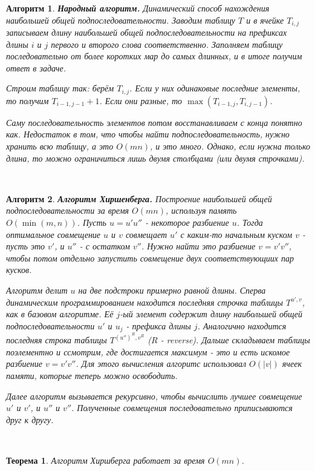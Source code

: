 \documentclass[a4paper]{article}
\theoremstyle{indented}
\newtheorem{theorem}{Теорема}
\newtheorem{alg}{Алгоритм}
\theoremstyle{definition}
\theoremstyle{remark}
\begin{document}
\begin{alg}
    \textbf{Народный алгоритм.} Динамический способ нахождения наибольшей общей подпоследовательности. Заводим таблицу $T$ и в ячейке $T_{i, j}$ записываем длину наибольшей общей подпоследовательности на префиксах длины $i$ и $j$ первого и второго слова соответственно. Заполняем таблицу последовательно от более коротких мар до самых длинных, и в итоге получим ответ в задаче. \ 

    Строим таблицу так: берём $T_{i, j}$. Если у них одинаковые последние элементы, то получим $T_{i-1, j-1}+1$. Если они разные, то $\max({T_{i-1, j}, T_{i, j-1}})$. \ 

    Саму последовательность элементов потом восстанавливаем с конца понятно как. Недостаток в том, что чтобы найти подпоследовательность, нужно хранить всю таблицу, а это $O(mn)$, и это много. Однако, если нужна только длина, то можно ограничиться лишь двумя столбцами (или двумя строчками).
\end{alg} \

\begin{alg}
    \textbf{Алгоритм Хиршенберга.} Построение наибольшей общей подпоследовательности за время $O(mn)$, используя память $O(\min(m, n))$. Пусть $u=u'u''$ - некоторое разбиение $u$. Тогда оптимальное совмещение $u$ и $v$ совмещает $u'$ с каким-то начальным куском $v$ - пусть это $v'$, и $u''$ - с остатком $v''$. Нужно найти это разбиение $v=v'v''$, чтобы потом отдельно запустить совмещение двух соответствующиих пар кусков. \ 

    Алгоритм делит $u$ на две подстроки примерно равной длины. Сперва динамическим программированием находится последняя строчка таблицы $T^{u', v}$, как в базовом алгоритме. Её $j$-ый элемент содержит длину наибольшей общей подпоследовательности $u'$ и $u_j$ - префикса длины $j$. Аналогично находится последняя строка таблицы $T^{(u'')^R, v^R}$ ($R$ - reverse). Дальше складываем таблицы поэлементно и ссмотрим, где достигается максимум - это и есть искомое разбиение $v=v'v''$. Для этого вычисления алгоритс использовал $O(|v|)$ ячеек памяти, которые теперь можно освободить. \ 

    Далее алгоритм вызывается рекурсивно, чтобы вычислить лучшее совмещение $u'$ и $v'$, и $u''$ и $v''$. Полученные совмещения последовательно приписываются друг к другу.
\end{alg} \

\begin{theorem}
    Алгоритм Хиршберга работает за время $O(mn)$. 
\end{theorem}
\end{document}
